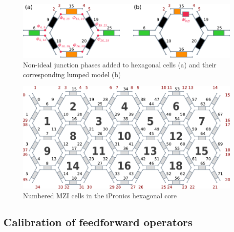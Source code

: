 \begin{figure}[h]
	\begin{center}
		\includegraphics{figures/ch4-super_puc_hex.pdf}
	\end{center}
	\caption{Non-ideal junction phases added to hexagonal cells (a) and their corresponding lumped model (b)}\label{fig:ch4-superpuc_hex}
\end{figure}

\begin{figure}
	\begin{center}
		\includegraphics{figures/ch4-hex_cells.pdf}
	\end{center}
	\caption{Numbered MZI cells in the iPronics hexagonal core}\label{fig:ch4-hex_cells}
\end{figure}


\subsection{Calibration of feedforward operators}\label{sub:calibration_of_feedforward_operators} %

